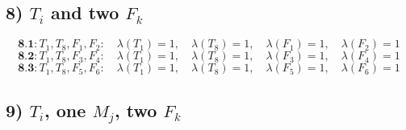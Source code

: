 \documentclass[12p]{article}
\numberwithin{equation}{section}
\begin{document}
\subsection*{8) $T_i$ and two $F_k$}
\[
\textbf{8.1}: T_1, T_8, F_1, F_2:\quad \lambda(T_1) = 1,\quad \lambda(T_8) = 1,\quad \lambda(F_1) = 1,\quad \lambda(F_2) = 1
\]
\[
\textbf{8.2}: T_1, T_8, F_3, F_4:\quad \lambda(T_1) = 1,\quad \lambda(T_8) = 1,\quad \lambda(F_3) = 1,\quad \lambda(F_4) = 1
\]
\[
\textbf{8.3}: T_1, T_8, F_5, F_6:\quad \lambda(T_1) = 1,\quad \lambda(T_8) = 1,\quad \lambda(F_5) = 1,\quad \lambda(F_6) = 1
\]

\subsection*{9) $T_i$, one $M_j$, two $F_k$}
\end{document}
